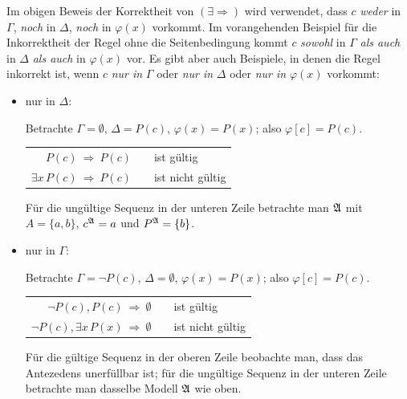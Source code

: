 \documentclass[fontsize=11pt, twoside=false, numbers=autoenddot]{scrbook}
\begin{document}
Im obigen Beweis der Korrektheit von $(\exists \Rightarrow)$ wird verwendet,
dass $c$ \emph{weder} in $\Gamma$, \emph{noch} in $\Delta$, \emph{noch} in $\varphi(x)$ vorkommt.
Im vorangehenden Beispiel für die Inkorrektheit der Regel ohne die Seitenbedingung
kommt $c$ \emph{sowohl} in $\Gamma$ \emph{als auch} in $\Delta$ \emph{als auch} in $\varphi(x)$ vor.
Es gibt aber auch Beispiele, in denen die Regel inkorrekt ist, wenn $c$
\emph{nur in} $\Gamma$ oder \emph{nur in} $\Delta$ oder \emph{nur in} $\varphi(x)$ vorkommt:
%
\begin{itemize}
  \item
    nur in $\Delta$:
    \par\smallskip
    Betrachte $\Gamma = \emptyset$, $\Delta = P(c)$, $\varphi(x) = P(x)$; also $\varphi[c] = P(c)$.
    \par\smallskip
    \begin{center}
      \begin{tabular}{r@{~}c@{\qquad}l@{}}
        $P(c) ~\Rightarrow~ P(c)$            & & ist gültig \\[2pt]\cline{1-1}
        \rule{0pt}{12pt}%
        $\exists x\,P(c) ~\Rightarrow~ P(c)$ & & ist nicht gültig
      \end{tabular}
    \end{center}
    \par\smallskip
    Für die ungültige Sequenz in der unteren Zeile betrachte man $\mathfrak{A}$ mit $A=\{a,b\}$, $c^\mathfrak{A} = a$ und $P^\mathfrak{A} = \{b\}$.
    \par\smallskip
  \item
    nur in $\Gamma$:
    \par\smallskip
    Betrachte $\Gamma = \lnot P(c)$, $\Delta = \emptyset$, $\varphi(x) = P(x)$; also $\varphi[c] = P(c)$.
    \par\smallskip
    \begin{center}
      \begin{tabular}{r@{~}c@{\qquad}l@{}}
        $\lnot P(c),P(c) ~\Rightarrow~ \emptyset$            & & ist gültig \\[2pt]\cline{1-1}
        \rule{0pt}{12pt}%
        $\lnot P(c),\exists x\,P(x) ~\Rightarrow~ \emptyset$ & & ist nicht gültig
      \end{tabular}
    \end{center}
    Für die gültige Sequenz in der oberen Zeile beobachte man, dass das Antezedens unerfüllbar ist;
    für die ungültige Sequenz in der unteren Zeile betrachte man dasselbe Modell $\mathfrak{A}$ wie oben.
    \par\smallskip

\end{itemize}
\end{document}
